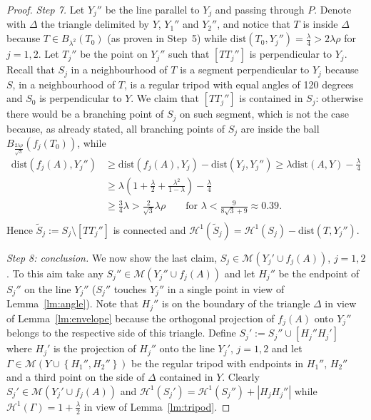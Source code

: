 \documentclass{amsart}
\renewcommand{\H}{\mathcal H}
\newcommand{\abs}[1]{\left\vert #1 \right\vert}
\newcommand{\enclose}[1]{\left(#1\right)}
\newcommand{\ENCLOSE}[1]{\left\{#1\right\}}
\newcommand{\M}{\mathcal{M}}
\renewcommand{\H}{\mathcal{H}}
\newcommand{\dist}{\mathrm{dist}}
\theoremstyle{definition}
\theoremstyle{remark}
\begin{document}
\begin{proof}
  \emph{Step 7.}
  Let $Y_j''$ be the line parallel to $Y_j$ and passing through $P$.
  Denote with $\Delta$ the triangle delimited by $Y$, $Y_1''$ and $Y_2''$,
  and notice that $T$ is inside $\Delta$ because $T\in B_{\lambda^2}(T_0)$
  (as proven in Step~5)
  while $\dist(T_0, Y_j'') = \frac{\lambda}{4}>2\lambda\rho$ for $j=1,2$.
  Let $T_j''$ be the point on $Y_j''$ such that $[T T_j'']$ is perpendicular
  to $Y_j$. 
  Recall that $S_j$ in a neighbourhood of $T$ is a segment perpendicular 
  to $Y_j$ because $S$, in a neighbourhood of $T$, 
  is a regular tripod with equal angles of 120 degrees 
  and $S_0$ is perpendicular to $Y$.
  We claim that $[T T_j'']$ is contained in $S_j$: otherwise there would 
  be a branching point of $S_j$ on such segment, which is not the case because,
  as already stated, all branching points of $S_j$ are inside 
  the ball $B_{\frac{2\lambda \rho}{\sqrt 3}}(f_j(T_0))$, while
  \begin{align*}
    \dist(f_j(A), Y_j'') 
    &\ge \dist(f_j(A), Y_j) - \dist(Y_j, Y_j'')
    \ge \lambda \dist(A,Y) - \frac{\lambda}{4}  \\
    & \ge \lambda \enclose{1 + \frac \lambda 2 + \frac{\lambda^2}{1-\lambda}} - \frac \lambda 4 \\ 
    & \ge \frac 3 4 \lambda
    > \frac 2 {\sqrt 3}\lambda\rho
    \qquad \text{for $\lambda < \frac{9}{8\sqrt 3+9}\approx 0.39$}. \\
  \end{align*}
  Hence $\tilde S_j:= S_j\setminus [T T_j'']$ is connected and 
  $\H^1(\tilde S_j)=\H^1(S_j) - \dist(T,Y_j'')$.

  \emph{Step 8: conclusion.}
  We now show the last claim, $S_j \in \M(Y_j'\cup f_j(A))$, $j=1,2$.
  To this aim take any $S_j''\in \M(Y_j''\cup f_j (A))$ and let $H_j''$ be the 
  endpoint of $S_j''$ on the line $Y_j''$ ($S_j''$ touches $Y_j''$ in a single point 
  in view of Lemma~\ref{lm:angle}). 
  Note that $H_j''$ is on the boundary of the triangle $\Delta$ 
  in view of Lemma~\ref{lm:envelope} 
  because the orthogonal 
  projection of $f_j(A)$ onto $Y_j''$ belongs to the respective side of this triangle.
  Define $S_j':= S_j''\cup [H_j'' H_j']$ where $H_j'$ is the projection of $H_j''$ 
  onto the line $Y_j'$, $j=1,2$ and let $\Gamma\in \M(Y\cup \ENCLOSE{H_1'',H_2''})$
  be the regular tripod with endpoints in $H_1''$, $H_2''$ and a third point on 
  the side of $\Delta$ contained in $Y$.
  Clearly $S_j'\in \M(Y_j'\cup f_j(A))$ and $\H^1(S_j')=\H^1(S_j'') + \abs{H_j H_j''}$
  while $\H^1(\Gamma) = 1+\frac \lambda 2$ in view of Lemma~\ref{lm:tripod}.


\end{proof}
\end{document}
